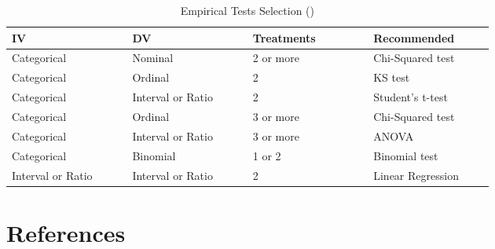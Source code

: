 \documentclass[
	letterpaper, %
]{jdf}
\begin{document}
\begin{table}[hbt!]
	\caption{Empirical Tests Selection (\cite{joyner2016b})}
	\small %
	\centering %
	\begin{tabular}{L{0.2\linewidth} L{0.2\linewidth} L{0.2\linewidth} L{0.2\linewidth}}
		\textbf{IV} & \textbf{DV} & \textbf{Treatments} & \textbf{Recommended}\\
		\toprule[0.5pt]
		Categorical & Nominal & 2 or more & Chi-Squared test \\
		\midrule
		Categorical & Ordinal & 2 & KS test \\
		\midrule
		Categorical & Interval or Ratio & 2 & Student's t-test \\
		\midrule
		Categorical & Ordinal & 3 or more & Chi-Squared test \\
		\midrule
		Categorical & Interval or Ratio & 3 or more & ANOVA \\
		\midrule
		Categorical & Binomial & 1 or 2 & Binomial test \\
		\midrule
		Interval or Ratio & Interval or Ratio & 2 & Linear Regression \\
	\end{tabular}
\end{table}
\clearpage

\section{References}
\printbibliography[heading=none]
\end{document}
